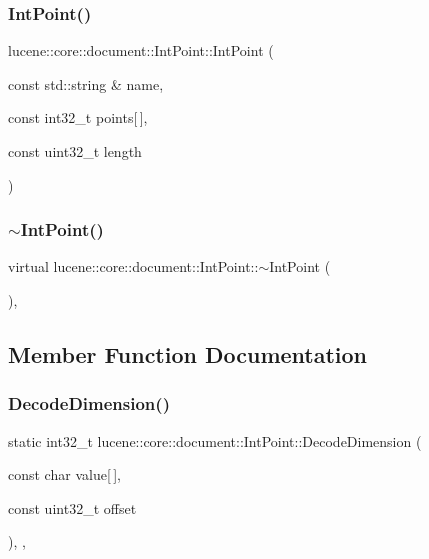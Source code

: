 \subsubsection{\texorpdfstring{Int\+Point()}{IntPoint()}}
{\footnotesize\ttfamily lucene\+::core\+::document\+::\+Int\+Point\+::\+Int\+Point (\begin{DoxyParamCaption}\item[{const std\+::string \&}]{name,  }\item[{const int32\+\_\+t}]{points\mbox{[}$\,$\mbox{]},  }\item[{const uint32\+\_\+t}]{length }\end{DoxyParamCaption})\hspace{0.3cm}{\ttfamily [inline]}}

\mbox{\label{classlucene_1_1core_1_1document_1_1IntPoint_ab5b682c697ecaf6a3c4081c786944b60}} 
\subsubsection{\texorpdfstring{$\sim$\+Int\+Point()}{~IntPoint()}}
{\footnotesize\ttfamily virtual lucene\+::core\+::document\+::\+Int\+Point\+::$\sim$\+Int\+Point (\begin{DoxyParamCaption}{ }\end{DoxyParamCaption})\hspace{0.3cm}{\ttfamily [inline]}, {\ttfamily [virtual]}}



\subsection{Member Function Documentation}
\mbox{\label{classlucene_1_1core_1_1document_1_1IntPoint_a29eaf7c0c579e416100f0cb16e622de7}} 
\subsubsection{\texorpdfstring{Decode\+Dimension()}{DecodeDimension()}}
{\footnotesize\ttfamily static int32\+\_\+t lucene\+::core\+::document\+::\+Int\+Point\+::\+Decode\+Dimension (\begin{DoxyParamCaption}\item[{const char}]{value\mbox{[}$\,$\mbox{]},  }\item[{const uint32\+\_\+t}]{offset }\end{DoxyParamCaption})\hspace{0.3cm}{\ttfamily [inline]}, {\ttfamily [static]}, {\ttfamily [noexcept]}}

